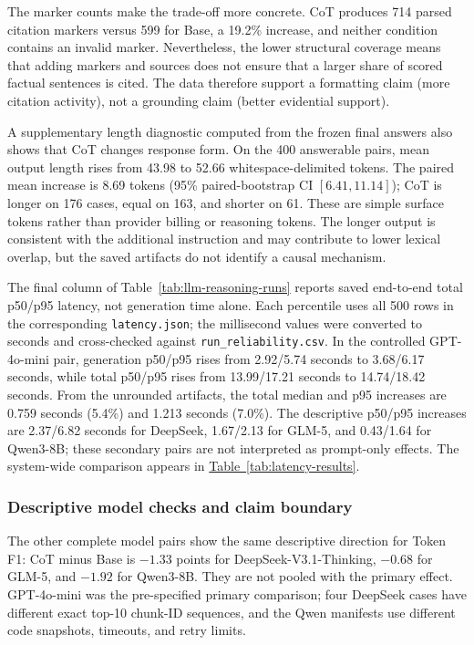 The marker counts make the trade-off more concrete. CoT produces 714 parsed
citation markers versus 599 for Base, a 19.2\% increase, and neither condition
contains an invalid marker. Nevertheless, the lower structural coverage means
that adding markers and sources does not ensure that a larger share of scored
factual sentences is cited. The data therefore support a formatting claim
(more citation activity), not a grounding claim (better evidential support).

A supplementary length diagnostic computed from the frozen final answers also
shows that CoT changes response form. On the 400 answerable pairs, mean output
length rises from 43.98 to 52.66 whitespace-delimited tokens. The paired mean
increase is 8.69 tokens (95\% paired-bootstrap CI $[6.41,11.14]$); CoT is
longer on 176 cases, equal on 163, and shorter on 61. These are simple surface
tokens rather than provider billing or reasoning tokens. The longer output is
consistent with the additional instruction and may contribute to lower lexical
overlap, but the saved artifacts do not identify a causal mechanism.

The final column of Table~\ref{tab:llm-reasoning-runs} reports saved
end-to-end total p50/p95 latency, not generation time alone. Each percentile
uses all 500 rows in the corresponding \texttt{latency.json}; the millisecond
values were converted to seconds and cross-checked against
\texttt{run\_reliability.csv}. In the controlled GPT-4o-mini pair, generation
p50/p95 rises from 2.92/5.74 seconds to 3.68/6.17 seconds, while total p50/p95
rises from 13.99/17.21 seconds to 14.74/18.42 seconds. From the unrounded
artifacts, the total median and p95 increases are 0.759 seconds (5.4\%) and
1.213 seconds (7.0\%). The descriptive p50/p95 increases are 2.37/6.82 seconds
for DeepSeek, 1.67/2.13 for GLM-5, and 0.43/1.64 for Qwen3-8B; these secondary
pairs are not interpreted as prompt-only effects. The system-wide comparison
appears in \hyperref[tab:latency-results]{Table~\ref*{tab:latency-results}}.

\subsubsection{Descriptive model checks and claim boundary}

The other complete model pairs show the same descriptive direction for Token
F1: CoT minus Base is $-1.33$ points for DeepSeek-V3.1-Thinking, $-0.68$
for GLM-5, and $-1.92$ for Qwen3-8B. They are not pooled with the primary
effect. GPT-4o-mini was the pre-specified primary comparison; four DeepSeek
cases have different exact top-10 chunk-ID sequences, and the Qwen manifests
use different code snapshots, timeouts, and retry limits.

